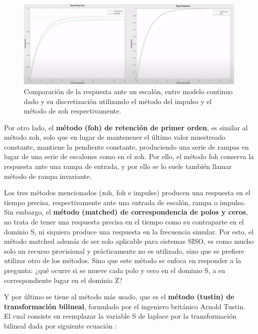 \documentclass{article}
\begin{document}
\begin{sloppypar}
\begin{figure}[H]
    \centering
    \includegraphics[width=1\textwidth]{Comparación de la respuesta ante un escalón, entre modelo continuo dado y su discretización utilizando el método del impulso y el método de zoh respectivamente}
    \caption{Comparación de la respuesta ante un escalón, entre modelo continuo dado y su discretización utilizando el método del impulso y el método de zoh respectivamente.}
    \label{fig:Comparación de la respuesta ante un escalón, entre modelo continuo dado y su discretización utilizando el método del impulso y el método de zoh respectivamente}
\end{figure}

Por otro lado, el \textbf{método (foh) de retención de primer orden}, es similar al método zoh, solo que en lugar de mantenener el último valor muestreado constante, mantiene la pendiente constante, produciendo una serie de rampas en lugar de una serie de escalones como en el zoh. Por ello, el método foh conserva la respuesta ante una rampa de entrada, y por ello se lo suele también llamar método de rampa invariante.

Los tres métodos mencionados (zoh, foh e impulse) producen una respuesta en el tiempo precisa, respectivamente ante una entrada de escalón, rampa o impulso. Sin embargo, el \textbf{método (matched) de correspondencia de polos y ceros}, no trata de tener una respuesta precisa en el tiempo como su contraparte en el dominio S, ni siquiera produce una respuesta en la frecuencia simular. Por esto, el método matched además de ser solo aplicable para sistemas SISO, es como mucho solo un recurso provisional y prácticamente no es utilizado, sino que se prefiere utilizar otro de los métodos. Sino que este método se enfoca en responder a la pregunta: ¿qué ocurre si se mueve cada polo y cero en el dominio S, a su correspondiente lugar en el dominio Z?

Y por último se tiene al método más usado, que es el \textbf{método (tustin) de transformación bilineal}, formulado por el ingeniero británico Arnold Tustin. El cual consiste en reemplazar la variable S de laplace por la transformación bilineal dada por siguiente ecuación :


\end{sloppypar}
\end{document}
